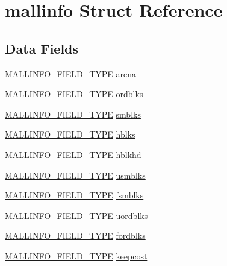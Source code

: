 \hypertarget{structmallinfo}{}\section{mallinfo Struct Reference}
\label{structmallinfo}
\subsection*{Data Fields}
\begin{DoxyCompactItemize}
\item 
\hyperlink{dl__malloc_8c_a53688562ed3d2eda132ae91de874cd98}{M\+A\+L\+L\+I\+N\+F\+O\+\_\+\+F\+I\+E\+L\+D\+\_\+\+T\+Y\+PE} \hyperlink{structmallinfo_a2dd8e574430e788f53919db129f2a2ff}{arena}
\item 
\hyperlink{dl__malloc_8c_a53688562ed3d2eda132ae91de874cd98}{M\+A\+L\+L\+I\+N\+F\+O\+\_\+\+F\+I\+E\+L\+D\+\_\+\+T\+Y\+PE} \hyperlink{structmallinfo_afaac6d1e005097fa1ed835684e23bfa7}{ordblks}
\item 
\hyperlink{dl__malloc_8c_a53688562ed3d2eda132ae91de874cd98}{M\+A\+L\+L\+I\+N\+F\+O\+\_\+\+F\+I\+E\+L\+D\+\_\+\+T\+Y\+PE} \hyperlink{structmallinfo_a93076145f3f542dfe5e4e6d1e3feaf0b}{smblks}
\item 
\hyperlink{dl__malloc_8c_a53688562ed3d2eda132ae91de874cd98}{M\+A\+L\+L\+I\+N\+F\+O\+\_\+\+F\+I\+E\+L\+D\+\_\+\+T\+Y\+PE} \hyperlink{structmallinfo_aaf01c52dcd016834ae176885fa32b550}{hblks}
\item 
\hyperlink{dl__malloc_8c_a53688562ed3d2eda132ae91de874cd98}{M\+A\+L\+L\+I\+N\+F\+O\+\_\+\+F\+I\+E\+L\+D\+\_\+\+T\+Y\+PE} \hyperlink{structmallinfo_ab78bcaeb59449f1a9c292bfe3dde8dbb}{hblkhd}
\item 
\hyperlink{dl__malloc_8c_a53688562ed3d2eda132ae91de874cd98}{M\+A\+L\+L\+I\+N\+F\+O\+\_\+\+F\+I\+E\+L\+D\+\_\+\+T\+Y\+PE} \hyperlink{structmallinfo_a470a5e18a1f5eb3cac48020268ca49b8}{usmblks}
\item 
\hyperlink{dl__malloc_8c_a53688562ed3d2eda132ae91de874cd98}{M\+A\+L\+L\+I\+N\+F\+O\+\_\+\+F\+I\+E\+L\+D\+\_\+\+T\+Y\+PE} \hyperlink{structmallinfo_a6b1a33ff0fc95bdab9c79ce271f58003}{fsmblks}
\item 
\hyperlink{dl__malloc_8c_a53688562ed3d2eda132ae91de874cd98}{M\+A\+L\+L\+I\+N\+F\+O\+\_\+\+F\+I\+E\+L\+D\+\_\+\+T\+Y\+PE} \hyperlink{structmallinfo_a4676f74c10d8bf8b79585b04d520356f}{uordblks}
\item 
\hyperlink{dl__malloc_8c_a53688562ed3d2eda132ae91de874cd98}{M\+A\+L\+L\+I\+N\+F\+O\+\_\+\+F\+I\+E\+L\+D\+\_\+\+T\+Y\+PE} \hyperlink{structmallinfo_a2fc75bf31817d4a64d0a6970aa5278dd}{fordblks}
\item 
\hyperlink{dl__malloc_8c_a53688562ed3d2eda132ae91de874cd98}{M\+A\+L\+L\+I\+N\+F\+O\+\_\+\+F\+I\+E\+L\+D\+\_\+\+T\+Y\+PE} \hyperlink{structmallinfo_a9cd2ce910ff603217426d9b1b7c0e430}{keepcost}
\end{DoxyCompactItemize}


